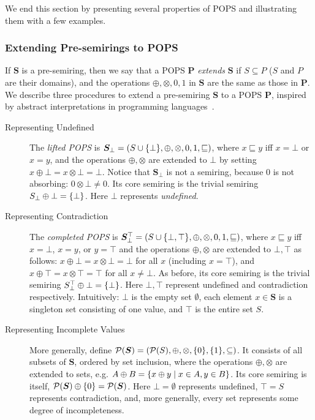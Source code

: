 We end this section by presenting several properties of POPS and
illustrating them  with a few examples.

\subsubsection{Extending Pre-semirings to POPS}

If $\bm S$ is a pre-semiring, then we say that a POPS $\bm P$ {\em
extends} $\bm S$ if $S \subseteq P$ ($S$ and $P$ are their domains), and the
operations $\oplus, \otimes, 0, 1$ in $\bm S$ are the same as those in $\bm P$.
We describe three procedures to extend a pre-semiring $\bm S$ to a
POPS $\bm P$, inspired by abstract interpretations in programming
languages~\cite{DBLP:conf/popl/CousotC77}.

\begin{description}
\item[Representing Undefined] The {\em lifted POPS} is
  $\bm S_\bot = (S \cup \{\bot\}, \oplus, \otimes, 0, 1,
  \sqsubseteq)$, where $x \sqsubseteq y$ iff $x = \bot$ or $x = y$,
  and the operations $\oplus, \otimes$ are extended to $\bot$ by
  setting $x \oplus \bot = x \otimes \bot = \bot$.  Notice that
  $\bm S_\bot$ is not a semiring, because $0$ is not absorbing:
  $0 \otimes \bot \neq 0$.  Its core semiring is the trivial semiring
  $S_\bot \oplus \bot = \{\bot\}$.  Here $\bot$ represents {\em
    undefined}.

\item[Representing Contradiction] The {\em completed POPS} is
  $\bm S_\bot^\top = (S \cup \{\bot, \top\}, \oplus, \otimes, 0, 1,
  \sqsubseteq)$, where $x \sqsubseteq y$ iff $x=\bot$, $x=y$, or
  $y=\top$ and the operations $\oplus, \otimes$ are extended to
  $\bot, \top$ as follows: $x \oplus \bot = x \otimes \bot = \bot$ for
  all $x$ (including $x=\top$), and
  $x \oplus \top = x \otimes \top = \top$ for all $x \neq \bot$.  As
  before, its core semiring is the trivial semiring
  $S_\bot^\top \oplus \bot = \{\bot\}$.  Here $\bot, \top$ represent
  undefined and contradiction respectively.  Intuitively: $\bot$ is
  the empty set $\emptyset$, each element $x \in \bm S$ is a singleton
  set consisting of one value, and $\top$ is the entire set $S$.

\item[Representing Incomplete Values] More generally, define
  $\mathcal P(\bm S) = (\mathcal P(S), \oplus, \otimes, \{0\}, \{1\}, \subseteq)$.  It
  consists of all subsets of $\bm S$, ordered by set inclusion, where
  the operations $\oplus, \otimes$ are extended to sets, e.g.
  $A \oplus B = \{{x\oplus y}\mid{x \in A, y \in B}\}$.  Its core
  semiring is itself, $\mathcal P(\bm S) \oplus \{0\} = \mathcal P(\bm S)$.
  Here $\bot=\emptyset$ represents undefined, $\top=S$ represents
  contradiction, and, more generally, every set represents some degree
  of incompleteness.
\end{description}


